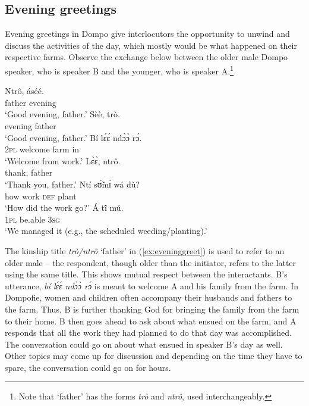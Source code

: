 \documentclass[output=paper,colorlinks,citecolor=brown]{langscibook}
\begin{document}
\subsection{Evening greetings}

Evening greetings in Dompo give interlocutors the opportunity to unwind and discuss the activities of the day, which mostly would be what happened on their respective farms. Observe the exchange below between the older male Dompo speaker, who is speaker B and the younger, who is speaker A.\footnote{Note that `father' has the forms \textit{trò} and \textit{ntrô}, used interchangeably.}

\ea \label{ex:eveninggreet}
\begin{xlist}
\ex 
    \gll Ntrô,		áséé.\\
    father		evening\\
    \glt		‘Good evening, father.’ 
\ex
    \gll Sèè,		trò. \\
    evening	father\\
    \glt		‘Good evening, father.’ 
\ex
    \gll Bí	lɛ́ɛ́		ndɔ̀ɔ̀	rɔ́.\\
    \textsc{2pl}	welcome	farm	in\\
    \glt ‘Welcome from work.’ 
\ex 
    \gll Lɛ̀ɛ̀,	ntrô. \\
		thank,	father\\
    \glt ‘Thank you, father.’ 
\ex
    \gll Ntí	sʊ̃̀mɪ̀	wá	dù?\\
			how	work	\textsc{def}	plant		\\	
	\glt	‘How did the work go?’ 
\ex 
   \gll Á	tĩ́		mú.\\
			\textsc{1pl}	be.able	\textsc{3sg}\\
    \glt ‘We managed it (e.g., the scheduled weeding/planting).’ 
\end{xlist}
\z

The kinship title \textit{trò/ntrô} `father' in (\ref{ex:eveninggreet}) is used to refer to an older male -- the respondent, though older than the initiator, refers to the latter using the same title. This shows mutual respect between the interactants. B’s utterance, \textit{bí lɛ́ɛ́ ndɔ̀ɔ̀ rɔ́} is meant to welcome A and his family from the farm. In Dompofie, women and children often accompany their husbands and fathers to the farm. Thus, B is further thanking God for bringing the family from the farm to their home. B then goes ahead to ask about what ensued on the farm, and A responds that all the work they had planned to do that day was accomplished. The conversation could go on about what ensued in speaker B’s day as well. Other topics may come up for discussion and depending on the time they have to spare, the conversation could go on for hours. 
\end{document}
